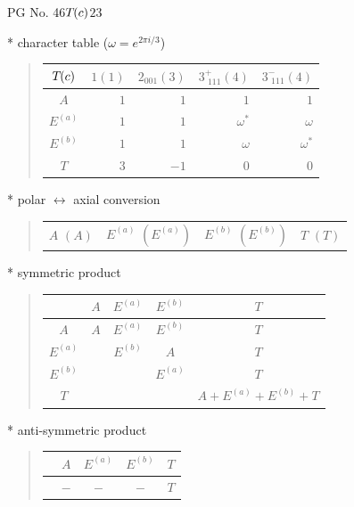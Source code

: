 \documentclass[fleqn,8pt,landscape]{jsarticle}
\begin{document}
\setcounter{MaxMatrixCols}{32}

\renewcommand{\tablename}{Table~}
\renewcommand{\figurename}{Figure~}
\begin{center}
\LARGE
PG No. 46\quad$T_{\rm }(c)$\quad$23$\quad[ cubic ]
\end{center}

* character table ($\omega=e^{2\pi i/3}$)
\begin{quote}
\begin{tabular}{crrrr} \hline \hline
$ T_{\rm }(c) $ & $ 1(1) $ & $ 2{}_{001}(3) $ & $ 3^{+}_{\,\,111}(4) $ & $ 3^{-}_{\,\,111}(4) $ \\ \hline
$ A $ & $ 1 $ & $ 1 $ & $ 1 $ & $ 1 $ \\
$ E^{(a)} $ & $ 1 $ & $ 1 $ & $ \omega^{*} $ & $ \omega $ \\
$ E^{(b)} $ & $ 1 $ & $ 1 $ & $ \omega $ & $ \omega^{*} $ \\
$ T $ & $ 3 $ & $ -1 $ & $ 0 $ & $ 0 $ \\
 \hline \hline
\end{tabular}
\end{quote}

* polar $\leftrightarrow$ axial conversion
\begin{quote}
\begin{tabular}{cccc}
$ A\,\,(A) $ & $ E^{(a)}\,\,(E^{(a)}) $ & $ E^{(b)}\,\,(E^{(b)}) $ & $ T\,\,(T) $
\end{tabular}
\end{quote}

* symmetric product
\begin{quote}
\begin{tabular}{c|cccc} \hline \hline
 & $ A $ & $ E^{(a)} $ & $ E^{(b)} $ & $ T $ \\ \hline
$ A $ & $ A $ & $ E^{(a)} $ & $ E^{(b)} $ & $ T $ \\
$ E^{(a)} $ & $  $ & $ E^{(b)} $ & $ A $ & $ T $ \\
$ E^{(b)} $ & $  $ & $  $ & $ E^{(a)} $ & $ T $ \\
$ T $ & $  $ & $  $ & $  $ & $ A + E^{(a)} + E^{(b)} + T $ \\
 \hline \hline
\end{tabular}
\end{quote}

* anti-symmetric product
\begin{quote}
\begin{tabular}{ccccc} \hline \hline
 & $ A $ & $ E^{(a)} $ & $ E^{(b)} $ & $ T $ \\ \hline
$  $ & $ - $ & $ - $ & $ - $ & $ T $ \\
 \hline \hline
\end{tabular}
\end{quote}
\end{document}
